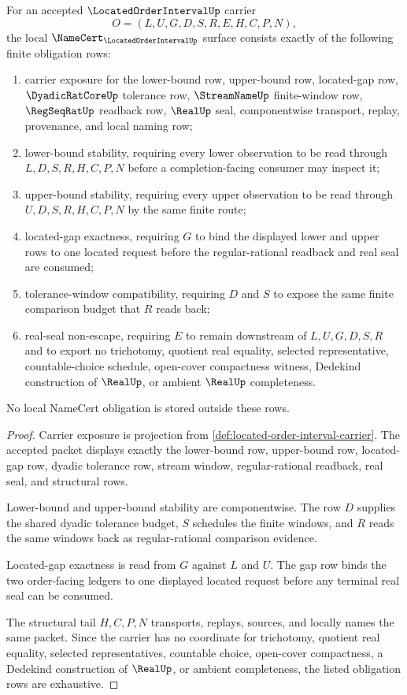 \begin{theorem}
\label{thm:located-order-interval-namecert-obligations}
For an accepted $\LocatedOrderIntervalUp$ carrier
$$
O=(L,U,G,D,S,R,E,H,C,P,N),
$$
the local $\NameCert_{\LocatedOrderIntervalUp}$ surface consists exactly of the following finite obligation rows:
\begin{enumerate}
\item carrier exposure for the lower-bound row, upper-bound row, located-gap row, $\DyadicRatCoreUp$ tolerance row, $\StreamNameUp$ finite-window row, $\RegSeqRatUp$ readback row, $\RealUp$ seal, componentwise transport, replay, provenance, and local naming row;
\item lower-bound stability, requiring every lower observation to be read through $L,D,S,R,H,C,P,N$ before a completion-facing consumer may inspect it;
\item upper-bound stability, requiring every upper observation to be read through $U,D,S,R,H,C,P,N$ by the same finite route;
\item located-gap exactness, requiring $G$ to bind the displayed lower and upper rows to one located request before the regular-rational readback and real seal are consumed;
\item tolerance-window compatibility, requiring $D$ and $S$ to expose the same finite comparison budget that $R$ reads back;
\item real-seal non-escape, requiring $E$ to remain downstream of $L,U,G,D,S,R$ and to export no trichotomy, quotient real equality, selected representative, countable-choice schedule, open-cover compactness witness, Dedekind construction of $\RealUp$, or ambient $\RealUp$ completeness.
\end{enumerate}
No local NameCert obligation is stored outside these rows.
\end{theorem}
\begin{proof}
Carrier exposure is projection from \autoref{def:located-order-interval-carrier}. The accepted packet displays exactly the lower-bound row, upper-bound row, located-gap row, dyadic tolerance row, stream window, regular-rational readback, real seal, and structural rows.

Lower-bound and upper-bound stability are componentwise. The row $D$ supplies the shared dyadic tolerance budget, $S$ schedules the finite windows, and $R$ reads the same windows back as regular-rational comparison evidence.

Located-gap exactness is read from $G$ against $L$ and $U$. The gap row binds the two order-facing ledgers to one displayed located request before any terminal real seal can be consumed.

The structural tail $H,C,P,N$ transports, replays, sources, and locally names the same packet. Since the carrier has no coordinate for trichotomy, quotient real equality, selected representatives, countable choice, open-cover compactness, a Dedekind construction of $\RealUp$, or ambient completeness, the listed obligation rows are exhaustive.
\end{proof}

